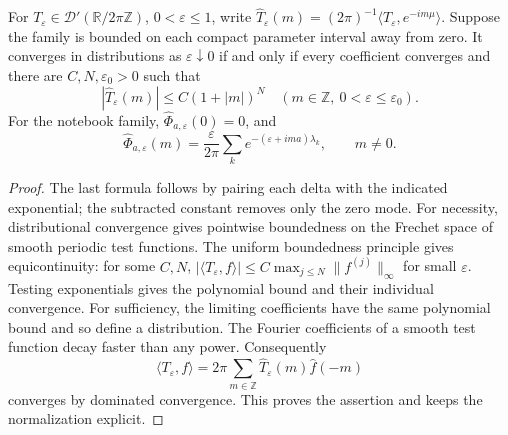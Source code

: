 \begin{lemma}\ours\quad
For \(T_\varepsilon\in\mathcal D'(\mathbb R/2\pi\mathbb Z)\),
\(0<\varepsilon\leq1\), write
\(\widehat T_\varepsilon(m)=(2\pi)^{-1}
\langle T_\varepsilon,e^{-im\mu}\rangle\).
Suppose the family is bounded on each compact parameter interval
away from zero. It converges in distributions as \(\varepsilon\downarrow0\)
if and only if every coefficient converges and there are
\(C,N,\varepsilon_0>0\) such that
\[
 |\widehat T_\varepsilon(m)|\leq C(1+|m|)^N
 \quad(m\in\mathbb Z,\ 0<\varepsilon\leq\varepsilon_0).
\]
For the notebook family, \(\widehat\Phi_{a,\varepsilon}(0)=0\), and
\[
 \widehat\Phi_{a,\varepsilon}(m)
 =\frac{\varepsilon}{2\pi}
    \sum_k e^{-(\varepsilon+ima)\lambda_k},\qquad m\ne0.
\]
\end{lemma}
\begin{proof}
The last formula follows by pairing each delta with the indicated
exponential; the subtracted constant removes only the zero mode.
For necessity, distributional convergence gives pointwise boundedness
on the Frechet space of smooth periodic test functions. The uniform
boundedness principle gives equicontinuity: for some \(C,N\),
\(|\langle T_\varepsilon,f\rangle|\leq
C\max_{j\leq N}\|f^{(j)}\|_\infty\) for small \(\varepsilon\).
Testing exponentials gives the polynomial bound and their individual
convergence. For sufficiency, the limiting coefficients have the same
polynomial bound and so define a distribution. The Fourier coefficients
of a smooth test function decay faster than any power. Consequently
\[
 \langle T_\varepsilon,f\rangle
   =2\pi\sum_{m\in\mathbb Z}
       \widehat T_\varepsilon(m)\widehat f(-m)
\]
converges by dominated convergence. This proves the assertion and keeps
the normalization explicit.
\end{proof}


